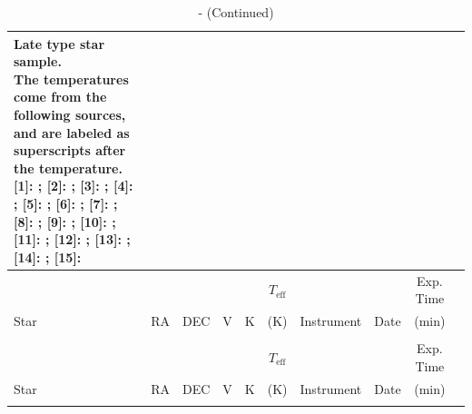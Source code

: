 \begin{scriptsize}
\begin{longtable}{lcccccrccc}
    
    \caption{Late type star sample. \\
    The temperatures come from the following sources, and are labeled as superscripts after the temperature. [1]:  \cite{Woolf2005}; [2]: \cite{Sousa2008}; [3]: \cite{Boyajian2013}; [4]: \cite{Alonso1996}; [5]: \cite{Valenti2005}; [6]: \cite{Neves2014}; [7]: \cite{Mann2015}; [8]: \cite{Casagrande2011}; [9]: \cite{Ramirez2005}; [10]: \cite{Casagrande2008}; [11]: \cite{Mishenina2012}; [12]: \cite{Casagrande2010}; [13]: \cite{Boyajian2012}; [14]: \cite{Pecaut2013}; [15]: \cite{Zboril1998}  \label{paper5_tab:latecal}} 
      \\ \hline
     & & & & & $T_\mathrm{eff}$ & & & Exp. Time \\
     Star & RA & DEC & V & K & (K) & Instrument  & Date  & (min) \\ \hline
    \endfirsthead

    \caption{ - (Continued)}
    \\ \hline
    & & & & & $T_\mathrm{eff}$ & & & Exp. Time \\
     Star & RA & DEC & V & K & (K) & Instrument  & Date  & (min) \\ \hline
    \endhead

    \hline
    \endfoot

    \hline
    \endlastfoot



\end{longtable}
\end{scriptsize}
